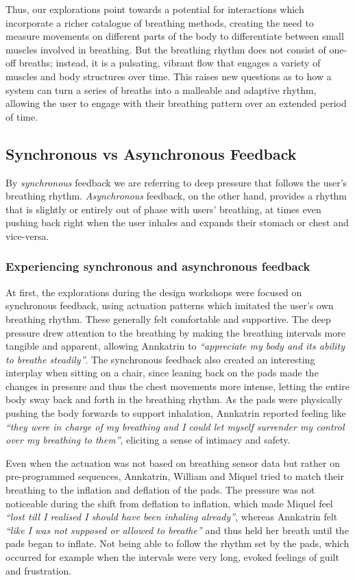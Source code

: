 Thus, our explorations point towards a potential for interactions which incorporate a richer catalogue of breathing methods, creating the need to measure movements on different parts of the body to differentiate between small muscles involved in breathing. But the breathing rhythm does not consist of one-off breaths; instead, it is a pulsating, vibrant flow that engages a variety of muscles and body structures over time. This raises new questions as to how a system can turn a series of breaths into a malleable and adaptive rhythm, allowing the user to engage with their breathing pattern over an extended period of time.


\subsection*{Synchronous vs Asynchronous Feedback}

By \textit{synchronous} feedback we are referring to deep pressure that follows the user's breathing rhythm. \textit{Asynchronous} feedback, on the other hand, provides a rhythm that is slightly or entirely out of phase with users' breathing, at times even pushing back right when the user inhales and expands their stomach or chest and vice-versa.

\subsubsection*{Experiencing synchronous and asynchronous feedback}

At first, the explorations during the design workshops were focused on synchronous feedback, using actuation patterns which imitated the user's own breathing rhythm. These generally felt comfortable and supportive. The deep pressure drew attention to the breathing by making the breathing intervals more tangible and apparent, allowing Annkatrin to \textit{``appreciate my body and its ability to breathe steadily''}. The synchronous feedback also created an interesting interplay when sitting on a chair, since leaning back on the pads made the changes in pressure and thus the chest movements more intense, letting the entire body sway back and forth in the breathing rhythm. As the pads were physically pushing the body forwards to support inhalation, Annkatrin reported feeling like \textit{``they were in charge of my breathing and I could let myself surrender my control over my breathing to them''}, eliciting a sense of intimacy and safety.

Even when the actuation was not based on breathing sensor data but rather on pre-programmed sequences, Annkatrin, William and Miquel tried to match their breathing to the inflation and deflation of the pads. The pressure was not noticeable during the shift from deflation to inflation, which made Miquel feel \textit{``lost till I realised I should have been inhaling already''}, whereas Annkatrin felt \textit{``like I was not supposed or allowed to breathe''} and thus held her breath until the pads began to inflate. Not being able to follow the rhythm set by the pads, which occurred for example when the intervals were very long, evoked feelings of guilt and frustration.

